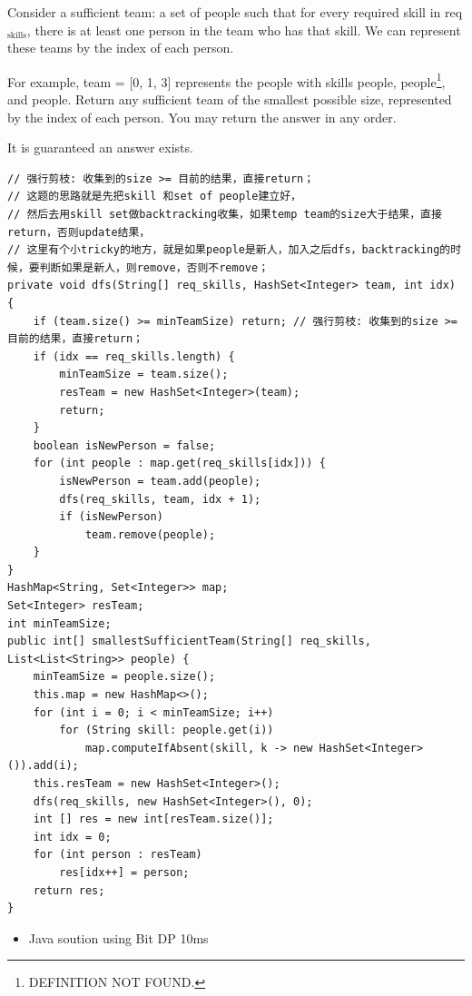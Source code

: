 \documentclass[9pt, b5paaper]{book}
\begin{document}
Consider a sufficient team: a set of people such that for every required skill in req$_{\text{skills}}$, there is at least one person in the team who has that skill. We can represent these teams by the index of each person.

For example, team = [0, 1, 3] represents the people with skills people\footnotemark[2]{}, people\footnote{DEFINITION NOT FOUND.}, and people\footnotemark[1]{}.
Return any sufficient team of the smallest possible size, represented by the index of each person. You may return the answer in any order.

It is guaranteed an answer exists.
\begin{verbatim}
// 强行剪枝: 收集到的size >= 目前的结果，直接return；
// 这题的思路就是先把skill 和set of people建立好，
// 然后去用skill set做backtracking收集，如果temp team的size大于结果，直接return，否则update结果，
// 这里有个小tricky的地方，就是如果people是新人，加入之后dfs，backtracking的时候，要判断如果是新人，则remove，否则不remove；
private void dfs(String[] req_skills, HashSet<Integer> team, int idx) {
    if (team.size() >= minTeamSize) return; // 强行剪枝: 收集到的size >= 目前的结果，直接return；
    if (idx == req_skills.length) {
        minTeamSize = team.size();
        resTeam = new HashSet<Integer>(team);
        return;
    }
    boolean isNewPerson = false;
    for (int people : map.get(req_skills[idx])) {
        isNewPerson = team.add(people);
        dfs(req_skills, team, idx + 1);
        if (isNewPerson)
            team.remove(people);
    }
}
HashMap<String, Set<Integer>> map;
Set<Integer> resTeam; 
int minTeamSize;
public int[] smallestSufficientTeam(String[] req_skills, List<List<String>> people) {
    minTeamSize = people.size();
    this.map = new HashMap<>(); 
    for (int i = 0; i < minTeamSize; i++) 
        for (String skill: people.get(i)) 
            map.computeIfAbsent(skill, k -> new HashSet<Integer>()).add(i);
    this.resTeam = new HashSet<Integer>();
    dfs(req_skills, new HashSet<Integer>(), 0);
    int [] res = new int[resTeam.size()];     
    int idx = 0;
    for (int person : resTeam) 
        res[idx++] = person;
    return res;
}
\end{verbatim}
\begin{itemize}
\item Java soution using Bit DP 10ms
\end{itemize}
\end{document}
